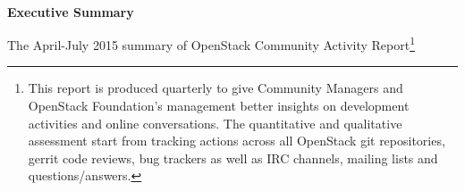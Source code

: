 \documentclass[a4wide,11pt]{report}
\begin{document}
~~\\
~~\\
~~\\
~~\\
~~\\
~~\\







\newpage

\begin{center}
\textbf{Executive Summary}
\end{center}

The April-July 2015 summary of OpenStack Community Activity
Report\footnote{This report is produced quarterly to give Community
Managers and OpenStack Foundation's management better insights on
development activities and online conversations. The quantitative and
qualitative assessment start from tracking actions across all
OpenStack git repositories, gerrit code reviews, bug trackers as well
as IRC channels, mailing lists and questions/answers.} 
\end{document}
